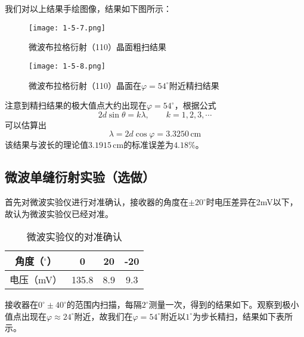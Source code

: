 \documentclass[12pt]{article}
\begin{document}
我们对以上结果手绘图像，结果如下图所示：

\begin{figure}[h!]
    \centering
    \texttt{[image: 1-5-7.png]}
    \caption{微波布拉格衍射（110）晶面粗扫结果}
\end{figure}

\begin{figure}[h!]
    \centering
    \texttt{[image: 1-5-8.png]}
    \caption{微波布拉格衍射（110）晶面在$\varphi=54^\circ$附近精扫结果}
\end{figure}

注意到精扫结果的极大值点大约出现在$\varphi=54^\circ$，根据公式
\[
    2d\sin\theta=k\lambda,\qquad k=1,2,3,\cdots
\]
可以估算出
\[
    \lambda=2d\cos\varphi=3.3250\,\mathrm{cm}
\]
该结果与波长的理论值$3.1915\,\mathrm{cm}$的标准误差为$4.18\%$。

\subsection{微波单缝衍射实验（选做）}
首先对微波实验仪进行对准确认，接收器的角度在$\pm20^\circ$时电压差异在2mV以下，故认为微波实验仪已经对准。

\begin{table}[h!]
    \centering
    \begin{tabular}{|c|c|c|c|}
    \hline
    角度（$^\circ$） & 0     & 20  & -20 \\ \hline
    电压（mV）       & 135.8 & 8.9 & 9.3 \\ \hline
    \end{tabular}
    \caption{微波实验仪的对准确认}
\end{table}

接收器在$0^\circ\pm40^\circ$的范围内扫描，每隔$2^\circ$测量一次，得到的结果如下。观察到极小值点出现在$\varphi\approx24^\circ$附近，故我们在$\varphi=54^\circ$附近以$1^\circ$为步长精扫，结果如下表所示。
\end{document}
